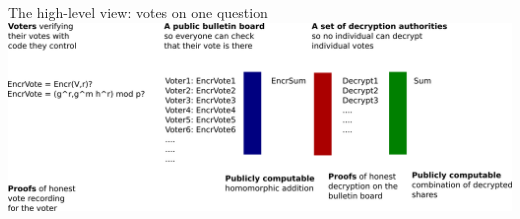 \documentclass[10pt,xcolor=svgnames,169]{beamer} %
\begin{document}
	\begin{frame}[fragile]{The high-level view: votes on one question}
	\includegraphics[scale=0.17]{e2e-vVoting-homomorphicAddition.png}
	\end{frame}
	
%	
\end{document}
